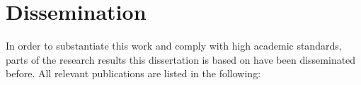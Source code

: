 \chapter*{Dissemination}
\label{chp:dissemination}
\vspace*{-10mm}

In order to substantiate this work and comply with high academic standards, parts of the research results this dissertation is based on have been disseminated before.
All relevant publications are listed in the following:

\nocite{
  Zarei2018,
  Zarei2020,
  Zarei2018a,
  Zarei2021,
  Zarei2017,
}






\cleardoublepage